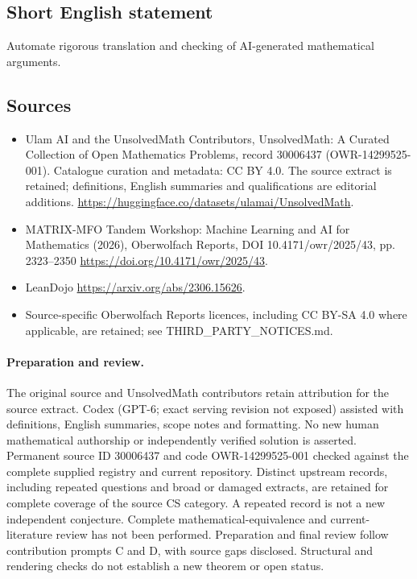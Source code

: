 \documentclass[11pt]{article}
\begin{document}
\subsection{Short English statement}
Automate rigorous translation and checking of AI-generated mathematical arguments.
\subsection{Sources}
\begin{itemize}
\item[\hypertarget{source:30006437:1}{S1}] Ulam AI and the UnsolvedMath Contributors, UnsolvedMath: A Curated Collection of Open Mathematics Problems, record 30006437 (OWR-14299525-001). Catalogue curation and metadata: CC BY 4.0. The source extract is retained; definitions, English summaries and qualifications are editorial additions.
\url{https://huggingface.co/datasets/ulamai/UnsolvedMath}.
\item[\hypertarget{source:30006437:2}{S2}] MATRIX-MFO Tandem Workshop: Machine Learning and AI for Mathematics (2026), Oberwolfach Reports, DOI 10.4171/owr/2025/43, pp. 2323--2350
\url{https://doi.org/10.4171/owr/2025/43}.
\item[\hypertarget{source:30006437:3}{S3}] LeanDojo
\url{https://arxiv.org/abs/2306.15626}.
\item Source-specific Oberwolfach Reports licences, including CC BY-SA 4.0 where applicable, are retained; see THIRD\_PARTY\_NOTICES.md.
\end{itemize}
\paragraph{Preparation and review.}
The original source and UnsolvedMath contributors retain attribution for the source extract. Codex (GPT-6; exact serving revision not exposed) assisted with definitions, English summaries, scope notes and formatting. No new human mathematical authorship or independently verified solution is asserted. Permanent source ID 30006437 and code OWR-14299525-001 checked against the complete supplied registry and current repository. Distinct upstream records, including repeated questions and broad or damaged extracts, are retained for complete coverage of the source CS category. A repeated record is not a new independent conjecture. Complete mathematical-equivalence and current-literature review has not been performed. Preparation and final review follow contribution prompts C and D, with source gaps disclosed. Structural and rendering checks do not establish a new theorem or open status.
\label{end:30006437}
\end{document}
